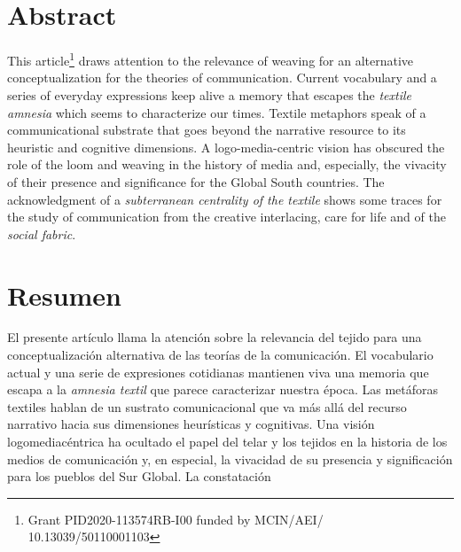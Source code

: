 \documentclass{tufte-handout}
\begin{document}
\begin{titlepage}
\vspace*{1em}




\hypertarget{abstract}{%
\section{Abstract}\label{abstract}}
This article\footnote{Grant PID2020-113574RB-I00 funded by MCIN/AEI/ 10.13039/50110001103}
 draws attention to the relevance of weaving for an
alternative conceptualization for the theories of communication. Current
vocabulary and a series of everyday expressions keep alive a memory that
escapes the \emph{textile amnesia} which seems to characterize our times.
Textile metaphors speak of a communicational substrate that goes beyond
the narrative resource to its heuristic and cognitive dimensions. A logo-media-centric vision has obscured the role of the loom and weaving
in the history of media and, especially, the vivacity of their presence
and significance for the Global South countries. The acknowledgment of a
\emph{subterranean centrality of the textile} shows some traces for the study
of communication from the creative interlacing, care for life and of the
\emph{social fabric}.


\hypertarget{resumen}{%
\section{Resumen}\label{resumen}}

El presente artículo llama la atención sobre la relevancia del tejido
para una conceptualización alternativa de las teorías de la
comunicación. El vocabulario actual y una serie de expresiones
cotidianas mantienen viva una memoria que escapa a la \emph{amnesia
textil} que parece caracterizar nuestra época. Las metáforas textiles
hablan de un sustrato comunicacional que va más allá del recurso
narrativo hacia sus dimensiones heurísticas y cognitivas. Una visión
logomediacéntrica ha ocultado el papel del telar y los tejidos en la
historia de los medios de comunicación y, en especial, la vivacidad de
su presencia y significación para los pueblos del Sur Global. La
constatación


\enlargethispage{2\baselineskip}

\vspace*{2em}



 \end{titlepage}
\end{document}

